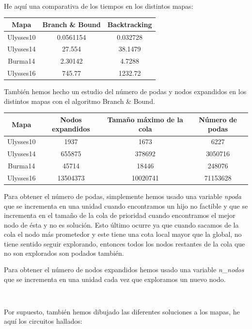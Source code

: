 \documentclass{article}
\begin{document}
	\
	
	He aquí una comparativa de los tiempos en los distintos mapas:
	
	\begin{longtable}{|c|c|c|}
		\hline
		Mapa & Branch \& Bound & Backtracking \\ \hline
		Ulysses10 & 0.0561154 & 0.032728  \\ \hline
		Ulysses14 & 27.554 & 38.1479 \\ \hline
		Burma14 & 2.30142 & 4.7288\\ \hline
		Ulysses16 & 745.77 & 1232.72\\ \hline
	\end{longtable}

	También hemos hecho un estudio del número de podas y nodos expandidos en los distintos mapas con el algoritmo Branch \& Bound.
	
	\begin{longtable}{|c|c|c|c|}
		\hline
		Mapa & Nodos expandidos & Tamaño máximo de la cola & Número de podas \\ \hline
		Ulysses10 & 1937 & 1673 & 6227  \\ \hline
		Ulysses14 & 655875 & 378692 & 3050716 \\ \hline
		Burma14 & 45714 & 18446 & 248076 \\ \hline
		Ulysses16 & 13504373 & 10020741 & 71153628 \\ \hline
	\end{longtable}

	Para obtener el número de podas, simplemente hemos usado una variable \textit{npoda} que se incrementa en una unidad cuando encontramos un hijo no factible y que se incrementa en el tamaño de la cola de prioridad cuando encontramos el mejor nodo de ésta y no es solución. Esto último ocurre ya que cuando sacamos de la cola el nodo más prometedor y este tiene una cota local mayor que la global, no tiene sentido seguir explorando, entonces todos los nodos restantes de la cola que no son explorados son podados también.
	\
	
	Para obtener el número de nodos expandidos hemos usado una variable \textit{n\_nodos} que se incrementa en una unidad cada vez que exploramos un nuevo nodo.
	
	\
	
	Por supuesto, también hemos dibujado las diferentes soluciones a los mapas, he aquí los circuitos hallados:
	
\end{document}
